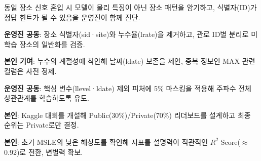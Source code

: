 \begin{substeps}
  \item 동일 장소 신호 혼입 시 모델이 물리 특징이 아닌 장소 패턴을 암기하고, 식별자(ID)가 정답 힌트가 될 수 있음을 운영진이 함께 진단.
  \item \textbf{운영진 공동}: 장소 식별자(sid·site)와 누수율(lrate)을 제거하고, 관로 ID별 분리로 미학습 장소의 일반화를 검증.
  \item \textbf{본인 기여}: 누수의 계절성에 착안해 날짜(ldate) 보존을 제안, 중복 정보인 MAX 관련 컬럼은 사전 정제.
\end{substeps}

\begin{substeps}
  \item \textbf{운영진 공동}: 핵심 변수(llevel·ldate) 제외 피처에 5\% 마스킹을 적용해 주파수 전체 상관관계를 학습하도록 유도.
  \item \textbf{본인}: Kaggle 대회를 개설해 Public(30\%)/Private(70\%) 리더보드를 설계하고 최종 순위는 Private로만 결정.
  \item \textbf{본인}: 초기 MSLE의 낮은 해상도를 확인해 지표를 설명력이 직관적인 $R^2$ Score($\approx$0.92)로 전환, 변별력 확보.
\end{substeps}

